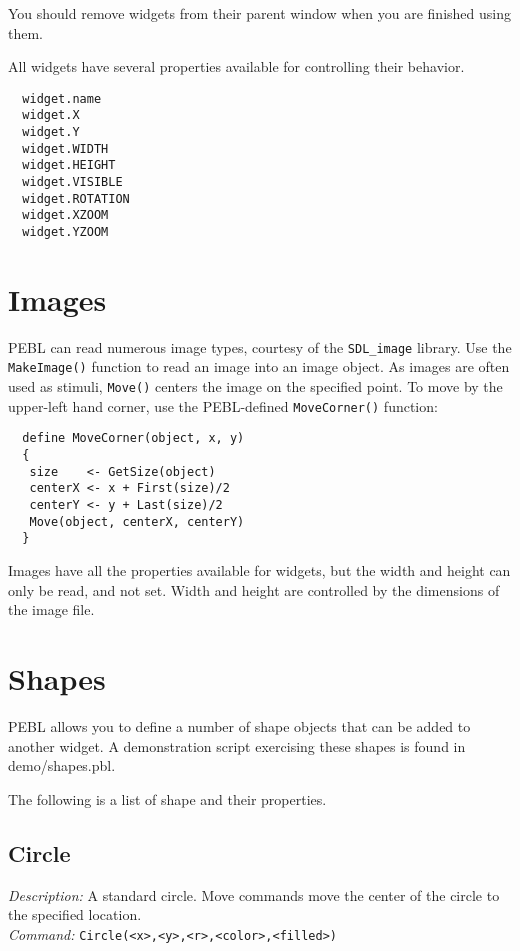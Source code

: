 You should remove widgets from their parent window when you are
finished using them.

All widgets have several properties available for controlling their
behavior.
\begin{verbatim}
  widget.name
  widget.X
  widget.Y
  widget.WIDTH
  widget.HEIGHT
  widget.VISIBLE
  widget.ROTATION
  widget.XZOOM
  widget.YZOOM
\end{verbatim}

  

\section{Images}

PEBL can read numerous image types, courtesy of the
\texttt{SDL\_image} library.  Use the \texttt{MakeImage()} function to
read an image into an image object.  As images are often used as
stimuli, \texttt{Move()} centers the image on the specified point.  To
move by the upper-left hand corner, use the PEBL-defined
\texttt{MoveCorner()} function:
\begin{verbatim}
  define MoveCorner(object, x, y)
  {
   size    <- GetSize(object)
   centerX <- x + First(size)/2
   centerY <- y + Last(size)/2
   Move(object, centerX, centerY)
  }
\end{verbatim}

Images have all the properties available for widgets, but the width
and height can only be read, and not set.  Width and height are
controlled by the dimensions of the image file.

\section{Shapes}
PEBL allows you to define a number of shape objects that can be added
to another widget.  A demonstration script exercising these shapes is found in demo/shapes.pbl.

The following is a list of shape and their properties.

\subsection{Circle}
\emph{Description:} A standard circle.  Move commands move the center
  of the circle to the specified location.\\

\emph{Command:}  \verb+Circle(<x>,<y>,<r>,<color>,<filled>)+\\

